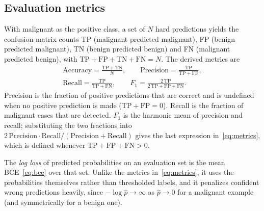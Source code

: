 \subsection{Evaluation metrics}
\label{sec:prelim-metrics}

With malignant as the positive class, a set of $N$ hard predictions yields the confusion-matrix counts TP (malignant predicted malignant), FP (benign predicted malignant), TN (benign predicted benign) and FN (malignant predicted benign), with $\mathrm{TP}+\mathrm{FP}+\mathrm{TN}+\mathrm{FN}=N$. The derived metrics are
\begin{equation}
  \begin{gathered}
  \mathrm{Accuracy}=\frac{\mathrm{TP}+\mathrm{TN}}{N},\qquad
  \mathrm{Precision}=\frac{\mathrm{TP}}{\mathrm{TP}+\mathrm{FP}},\\
  \mathrm{Recall}=\frac{\mathrm{TP}}{\mathrm{TP}+\mathrm{FN}},\qquad
  F_1=\frac{2\,\mathrm{TP}}{2\,\mathrm{TP}+\mathrm{FP}+\mathrm{FN}} .
  \end{gathered}
  \label{eq:metrics}
\end{equation}
Precision is the fraction of positive predictions that are correct and is undefined when no positive prediction is made ($\mathrm{TP}+\mathrm{FP}=0$). Recall is the fraction of malignant cases that are detected. $F_1$ is the harmonic mean of precision and recall; substituting the two fractions into $2\,\mathrm{Precision}\cdot\mathrm{Recall}/(\mathrm{Precision}+\mathrm{Recall})$ gives the last expression in~\eqref{eq:metrics}, which is defined whenever $\mathrm{TP}+\mathrm{FP}+\mathrm{FN}>0$.

The \emph{log loss} of predicted probabilities on an evaluation set is the mean BCE~\eqref{eq:bce} over that set. Unlike the metrics in~\eqref{eq:metrics}, it uses the probabilities themselves rather than thresholded labels, and it penalizes confident wrong predictions heavily, since $-\log\hat p\to\infty$ as $\hat p\to 0$ for a malignant example (and symmetrically for a benign one).

